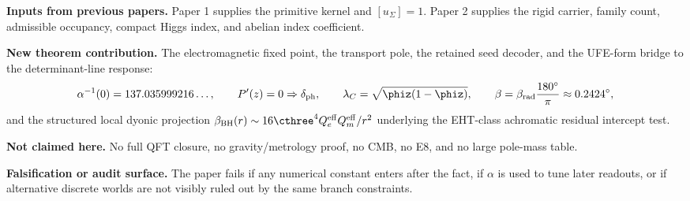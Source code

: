 
\maketitle

\begin{abstract}
This paper isolates the precision-readout layer of TFPT after the primitive kernel and carrier
packet have been fixed. It treats the electromagnetic fixed point, the transport pole of the cusp
cubic, the retained seed decoder, and the flavor transport grammar yielding $\alpha$,
$\delta_{\mathrm{ph}}$, $\lambda_C$, $\beta_{\mathrm{rad}}$, $\Omega_b$, $\theta_{13}$, CKM, and
PMNS readouts.
\end{abstract}

\begin{tfptfrontbox}
\textbf{Inputs from previous papers.} Paper 1 supplies the primitive kernel and $[u_\Sigma]=1$.
Paper 2 supplies the rigid carrier, family count, admissible occupancy, compact Higgs index, and
abelian index coefficient.

\textbf{New theorem contribution.} The electromagnetic fixed point, the transport pole, the
retained seed decoder, and the UFE-form bridge to the determinant-line response:
\[
\alpha^{-1}(0)=137.035999216\ldots,\qquad
P'(z)=0\Rightarrow\delta_{\mathrm{ph}},\qquad
\lambda_C=\sqrt{\phiz(1-\phiz)},\qquad
\beta=\beta_{\mathrm{rad}}\frac{180^\circ}{\pi}\approx 0.2424^\circ,
\]
and the structured local dyonic projection $\beta_{\mathrm{BH}}(r)\sim 16\cthree^4
Q_e^{\mathrm{eff}}Q_m^{\mathrm{eff}}/r^2$ underlying the EHT-class achromatic residual intercept
test.

\textbf{Not claimed here.} No full QFT closure, no gravity/metrology proof, no CMB, no E8, and no
large pole-mass table.

\textbf{Falsification or audit surface.} The paper fails if any numerical constant enters after the
fact, if $\alpha$ is used to tune later readouts, or if alternative discrete worlds are not visibly
ruled out by the same branch constraints.
\end{tfptfrontbox}


